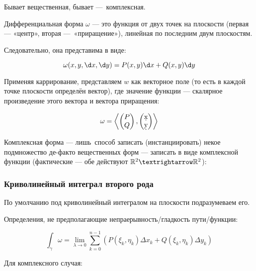 \documentclass[12pt, a4paper, oneside]{memoir}
\begin{document}
\begin{definition}
    
    Бывает вещественная, бывает — комплексная.

Дифференциальная форма $\omega$ — это функция от двух точек на плоскости (первая — «центр», вторая — «приращение»), линейная по последним двум плоскостям.

Следовательно, она представима в виде:

\begin{equation}
    \omega(x, y, \d x, \d y) = P(x, y) \d x + Q(x, y) \d y
\end{equation}

Применяя каррирование, представляем $w$ как векторное поле (то есть в каждой точке плоскости определён вектор),
где значение функции — скалярное произведение этого вектора и вектора приращения:

\begin{equation}
    \omega = \left\langle \begin{pmatrix}
        P \\ Q
    \end{pmatrix}, \begin{pmatrix}
        \d x \\ 
        \d y
    \end{pmatrix} \right\rangle
\end{equation}


    Комплексная форма — лишь способ записать (инстанциировать) некое подмножество де-факто вещественных форм —
    записать в виде комплексной функции (фактические — обе действуют $\sR^2 → \sR^2$):
\end{definition}


\subsubsection{Криволинейный интеграл \textbf{второго} рода}

По умолчанию под криволинейный интегралом на плоскости подразумеваем его.

Определения, не предполагающие непраерывность/гладкость пути/функции:

\begin{equation}
    \int_\gamma \omega=\lim _{\lambda \rightarrow 0} \sum_{k=0}^{n-1}\left(P\left(\xi_k, \eta_k\right) \Delta x_k+Q\left(\xi_k, \eta_k\right) \Delta y_k\right)
\end{equation}

Для комплексного случая: 
\end{document}
